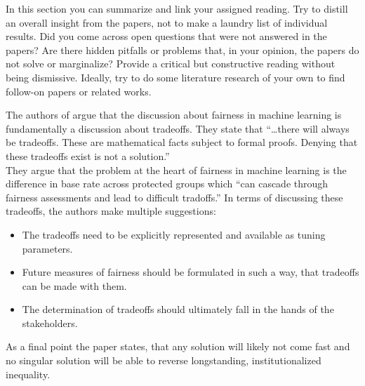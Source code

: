 In this section you can summarize and link your assigned reading. Try to distill an overall insight 
from the papers, not to make a laundry list of individual results. Did you come across open questions 
that were not answered in the papers? Are there hidden pitfalls or problems that, in your opinion, the 
papers do not solve or marginalize? Provide a critical but constructive reading without being dismissive. 
Ideally, try to do some literature research of your own to find follow-on papers or related works. 


The authors of \cite{Berk.2018} argue that the discussion about fairness in machine learning 
is fundamentally a discussion about tradeoffs. They state that \enquote{\dots there will 
always be tradeoffs. These are mathematical facts subject to formal proofs. Denying that these
tradeoffs exist is not a solution.} \\
They argue that the problem at the heart of fairness in machine learning is the difference
in base rate across protected groups which \enquote{can cascade through fairness assessments
and lead to difficult tradoffs.} In terms of discussing these tradeoffs, the authors make multiple
suggestions:
\begin{itemize}
    \item The tradeoffs need to be explicitly represented and available as tuning parameters.
    \item Future measures of fairness should be formulated in such a way, that tradeoffs can
    be made with them.
    \item The determination of tradeoffs should ultimately fall in the hands of the stakeholders.
\end{itemize}
As a final point the paper states, that any solution will likely not come fast and no singular
solution will be able to reverse longstanding, institutionalized inequality.